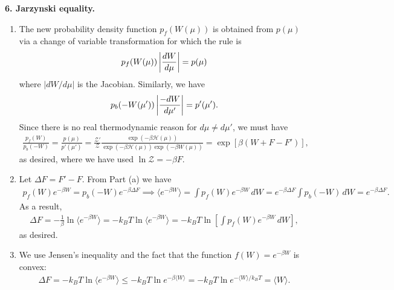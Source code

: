 \documentclass{article}
\theoremstyle{definition}
\newcommand{\ham}{\mathcal{H}}
\newcommand{\be}{\beta}
\newcommand{\f}[2]{\frac{#1}{#2}}
\newcommand{\lb}{\left[}
\newcommand{\rb}{\right]}
\begin{document}
\noindent \textbf{6. Jarzynski equality.} 


\begin{enumerate}[label=(\alph*)]
	\item The new probability density function $p_f(W(\mu))$ is obtained from $p(\mu)$ via a change of variable transformation for which the rule is 
	\begin{align*}
	p_f(W(\mu))\, \abs{\f{dW}{d\mu}} = p(\mu)
	\end{align*}
	where $|dW/d\mu|$ is the Jacobian. Similarly, we have
	\begin{align*}
	p_b(-W(\mu'))\, \abs{\f{-dW}{d\mu'}} = p'(\mu').
	\end{align*}
	Since there is no real thermodynamic reason for $d\mu \neq d\mu'$, we must have
	\begin{align*}
	\f{p_f(W)}{p_b(-W)} = \f{p(\mu)}{p'(\mu')} = \f{\mathcal{Z}'}{\mathcal{Z}} \f{\exp(-\be\ham(\mu))}{\exp(-\be\ham(\mu)) \exp(-\be W(\mu))} = \exp[\be(W + F - F')], 
	\end{align*}
	as desired, where we have used $\ln \mathcal{Z} = -\be F$. 
	
	
	
	\item Let $\Delta F = F'-F$. From Part (a) we have
	\begin{align*}
	p_f(W) e^{-\be W} = p_b(-W)e^{-\be \Delta F} \implies \langle e^{-\be W}\rangle = \int p_f(W) e^{-\be W}\,dW = e^{-\be \Delta F} \int p_b(-W)\,dW = e^{-\be \Delta F}.
	\end{align*}
	As a result, 
	\begin{align*}
	\Delta F = -\f{1}{\be}\ln \langle e^{-\be W} \rangle = -k_BT \ln \langle e^{-\be W} \rangle  = 
	-k_BT \ln \lb \int p_f(W) e^{-\be W}\,dW  \rb,
	\end{align*}
	as desired.
	
	
	\item We use Jensen's inequality and the fact that the function $f(W) = e^{-\be W}$ is convex:
	\begin{align*}
	\Delta F = -k_BT \ln \langle e^{-\be W} \rangle \leq -k_BT \ln e^{-\be \langle W \rangle}=  -k_BT \ln e^{-\langle W \rangle/k_BT}= \langle W \rangle.
	\end{align*}
	

\end{enumerate}
\end{document}
